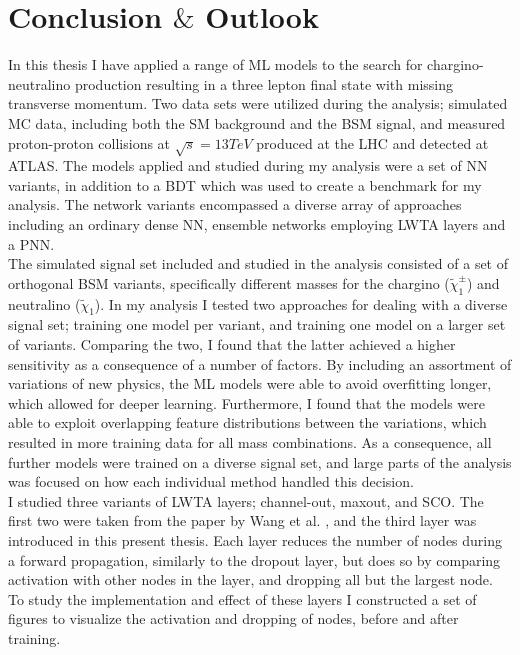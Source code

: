 \newpage
\chapter*{Conclusion $\&$ Outlook}
In this thesis I have applied a range of \ac{ML} models to the search for chargino-neutralino production resulting in 
a three lepton final state with missing transverse momentum. Two data sets were utilized during the analysis; simulated \ac{MC} data, including 
both the \ac{SM} background and the \ac{BSM} signal, and  measured proton-proton collisions at $\sqrt{s} = 13TeV$ produced at the \ac{LHC} and detected 
at \ac{ATLAS}. The models applied and studied during my analysis were a set of \ac{NN} variants, in addition to a \ac{BDT} which was used to 
create a benchmark for my analysis. The network variants encompassed a diverse array of approaches including an ordinary dense \ac{NN}, ensemble networks 
employing \ac{LWTA} layers and a \ac{PNN}.
\\\newline
The simulated signal set included and studied in the analysis consisted of a set of orthogonal \ac{BSM} variants, specifically different masses for the chargino ($\tilde{\chi}^\pm_1$) 
and neutralino ($\tilde{\chi}_1$). In my analysis I tested two approaches for dealing with a diverse signal set; training one model per variant, and training one model on a larger set 
of variants. Comparing the two, I found that the latter achieved a higher sensitivity as a consequence of a number of factors. By including an assortment of variations of new physics, 
the \ac{ML} models were able to avoid overfitting longer, which allowed for deeper learning. Furthermore, I found that the models were able to exploit overlapping feature distributions between 
the variations, which resulted in more training data for all mass combinations. As a consequence, all further models were trained on a diverse signal set, and large parts of the analysis 
was focused on how each individual method handled this decision.
\\\newline
I studied three variants of \ac{LWTA} layers; channel-out, maxout, and \ac{SCO}. The first two were taken from the paper by Wang et al. \cite{wang_maxout_2013}, and the third layer was introduced
in this present thesis. Each layer reduces the number of nodes during a forward propagation, similarly to the dropout layer, but does so by comparing activation with other nodes in the layer, and 
dropping all but the largest node. To study the implementation and effect of these layers I constructed a set of figures to visualize the activation and dropping of nodes, before and after training. 
